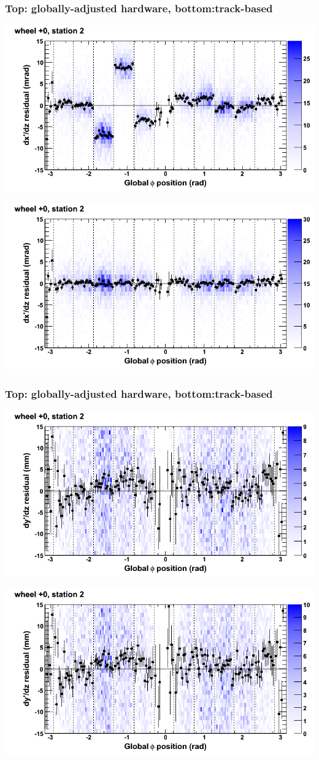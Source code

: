 \documentclass[compress]{beamer}
\begin{document}
\begin{frame}
\frametitle{Top: globally-adjusted hardware, bottom:track-based}
\includegraphics[width=0.7\linewidth]{NOV4_mapplots_HW/DTvsphi_st2whC_dxdz.png}

\includegraphics[width=0.7\linewidth]{NOV4_mapplots/DTvsphi_st2whC_dxdz.png}
\end{frame}

\begin{frame}
\frametitle{Top: globally-adjusted hardware, bottom:track-based}
\includegraphics[width=0.7\linewidth]{NOV4_mapplots_HW/DTvsphi_st2whC_dydz.png}

\includegraphics[width=0.7\linewidth]{NOV4_mapplots/DTvsphi_st2whC_dydz.png}
\end{frame}
\end{document}
